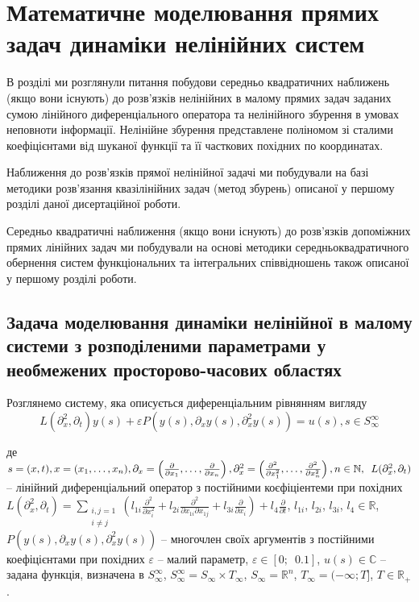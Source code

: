 \chapter{Математичне моделювання прямих задач динаміки нелінійних систем} \label{ch:chapt2}

В розділі ми розглянули питання побудови середньо квадратичних наближень (якщо вони існують) до розв'язків нелінійних
в малому прямих задач заданих сумою лінійного диференціального оператора та нелінійного збурення в умовах неповноти
інформації.
Нелінійне збурення представлене поліномом зі сталими коефіцієнтами від шуканої функції та її часткових
похідних по координатах.

Наближення до розв'язків прямої нелінійної задачі ми побудували на базі методики розв'язання квазілінійних задач
(метод збурень) описаної у першому розділі даної дисертаційної роботи.

Середньо квадратичні наближення (якщо вони існують) до розв'язків допоміжних прямих лінійних задач ми
побудували на основі методики середньоквадратичного обернення систем функціональних та інтегральних співвідношень
також описаної у першому розділі роботи.

\section{Задача моделювання динаміки нелінійної в малому системи з розподіленими параметрами у необмежених
просторово-часових областях} \label{sec:sect2_1}

Розглянемо систему, яка описується диференціальним рівнянням вигляду
\begin{equation}
    \label{eq:small_parameter_common_system}
L(\partial_x^2, \partial_t)y(s) + \varepsilon P(y(s), \partial_x y(s), \partial_x^2 y(s)) = u(s), s\in S_\infty^\infty
\end{equation}

де $ s=(x, t), x = (x_1,\dots,x_n),
\partial_x=\left(\frac{\partial}{\partial x_1},\dots, \frac{\partial}{\partial x_n}\right),
\partial^2_x=\left(\frac{\partial^2}{\partial x^2_1},\dots, \frac{\partial^2}{\partial x^2_n}\right),\\
n \in \mathbb{N}, \enspace
L(\partial_x^2, \partial_t)
$ -- лінійний диференціальний оператор з постійними коєфіціентеми при похідних
$
L(\partial_x^2, \partial_t)=\sum\limits_{ \substack{i,j=1\\ i\neq j}}\left(l_{1i} \frac{\partial^2}{\partial x^2_i} +
l_{2i}\frac{\partial^2}{\partial x_{1i}
\partial x_{1j}} + l_{3i} \frac{\partial}{\partial x_i} \right) + l_4 \frac{\partial}{\partial t}
$, \enspace
$l_{1i}$, $l_{2i}$, $l_{3i}$, $l_{4}\in\mathbb{R}$,
\enspace $P(y(s), \partial_x y(s), \partial_x^2 y(s))$ -- многочлен своїх аргументів з постійними коефіцієнтами при
похідних $\varepsilon$ -- малий параметр, $\varepsilon\in[0;\enspace0.1]$, $u(s)\in\mathbb{C}$ -- задана функція,
визначена в $S_\infty^\infty$, \enspace$S_\infty^\infty=S_\infty \times T_\infty$, \enspace
$S_\infty = \mathbb{R}^n$, \enspace$T_\infty=
(-\infty;T]$, $T\in\mathbb{R_+}$.

